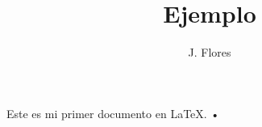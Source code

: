 \documentclass[12pt,a4paper]{article}
\author{J. Flores}
\title{Ejemplo}
\begin{document}
Este es mi primer documento en \LaTeX.
•
\end{document}
